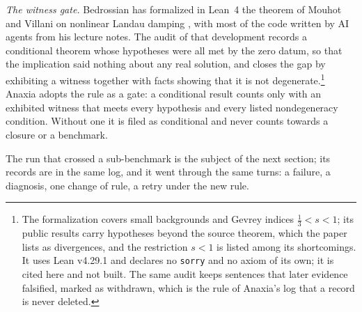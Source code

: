 \emph{The witness gate.} Bedrossian has formalized in Lean~4 the theorem of Mouhot and Villani on nonlinear Landau damping \cite{MV11,Bed26}, with most of the code written by AI agents from his lecture notes. The audit of that development records a conditional theorem whose hypotheses were all met by the zero datum, so that the implication said nothing about any real solution, and closes the gap by exhibiting a witness together with facts showing that it is not degenerate.\footnote{The formalization covers small backgrounds and Gevrey indices $\frac13<s<1$; its public results carry hypotheses beyond the source theorem, which the paper lists as divergences, and the restriction $s<1$ is listed among its shortcomings. It uses Lean v4.29.1 and declares no \texttt{sorry} and no axiom of its own; it is cited here and not built. The same audit keeps sentences that later evidence falsified, marked as withdrawn, which is the rule of Anaxia's log that a record is never deleted.} Anaxia adopts the rule as a gate: a conditional result counts only with an exhibited witness that meets every hypothesis and every listed nondegeneracy condition. Without one it is filed as conditional and never counts towards a closure or a benchmark.

The run that crossed a sub-benchmark is the subject of the next section; its records are in the same log, and it went through the same turns: a failure, a diagnosis, one change of rule, a retry under the new rule.
